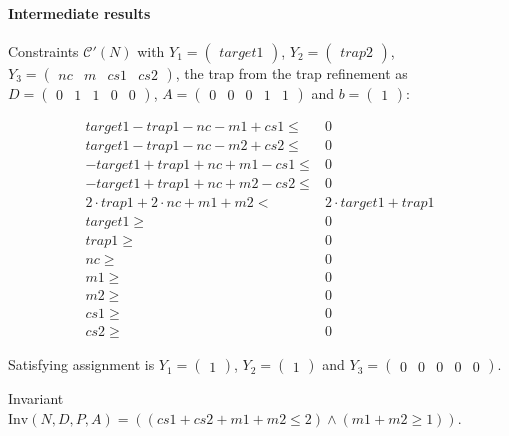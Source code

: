 \documentclass{article}
\begin{document}
\paragraph{Intermediate results}
Constraints $\mathcal C'(N)$ with
$Y_1 = \begin{pmatrix}target1 \end{pmatrix}$,
$Y_2 = \begin{pmatrix}trap2 \end{pmatrix}$,
$Y_3 =\begin{pmatrix}nc & m & cs1 & cs2\end{pmatrix}$,
the trap from the trap refinement as
$D =\begin{pmatrix}0 & 1 & 1 & 0 & 0 \end{pmatrix}$,
$A =\begin{pmatrix}0 & 0 & 0 & 1 & 1 \end{pmatrix}$ and
$b =\begin{pmatrix}1 \end{pmatrix}$:

\begin{align*}
  target1 - trap1 - nc - m1 + cs1 \le& 0 \\ 
  target1 - trap1 - nc - m2 + cs2 \le& 0 \\ 
  - target1 + trap1 + nc + m1 - cs1 \le& 0 \\ 
  - target1 + trap1 + nc + m2 - cs2 \le& 0 \\ 
2 \cdot trap1 + 2 \cdot nc + m1 + m2 <& 2 \cdot target1 + trap1 \\
  target1 \ge& 0 \\
  trap1 \ge& 0 \\
  nc \ge& 0 \\
  m1 \ge& 0 \\
  m2 \ge& 0 \\
  cs1 \ge& 0 \\
  cs2 \ge& 0
\end{align*}

Satisfying assignment is
$Y_1 = \begin{pmatrix} 1 \end{pmatrix}$,
$Y_2 = \begin{pmatrix} 1 \end{pmatrix}$ and
$Y_3 = \begin{pmatrix}0 & 0 & 0 & 0 & 0 \end{pmatrix}$.

Invariant $\text{Inv}(N, D, P, A) =
((cs1 + cs2 + m1 + m2 \le 2) \land (m1 + m2 \ge 1))$.
\end{document}
